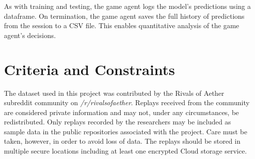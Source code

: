 As with training and testing, the game agent logs the model's predictions using a dataframe. On termination, the game agent saves the full history of predictions from the session to a CSV file. This enables quantitative analysis of the game agent's decisions.




\section{Criteria and Constraints}

The dataset used in this project was contributed by the Rivals of Aether subreddit community on \textit{/r/rivalsofaether}. Replays received from the community are considered private information and may not, under any circumstances, be redistributed. Only replays recorded by the researchers may be included as sample data in the public repositories associated with the project. Care must be taken, however, in order to avoid loss of data. The replays should be stored in multiple secure locations including at least one encrypted Cloud storage service.

